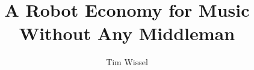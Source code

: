 \documentclass[whitelogo]{tudelft-report}
\begin{document}
\frontmatter


\title[tudelft-white]{A Robot Economy for Music Without Any Middleman}
\author[tudelft-white]{Tim Wissel}
\makecover[split]






\tableofcontents

\mainmatter







\appendix

%


\end{document}
